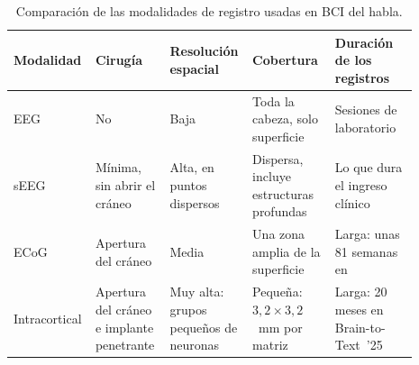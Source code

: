 \begin{table}[htbp]
  \centering
  \caption{Comparación de las modalidades de registro usadas en BCI del habla.}
  \label{tab:sota-modalidades}
  \footnotesize
  \setlength{\tabcolsep}{4pt}
  \renewcommand{\arraystretch}{1.2}
  \begin{tabular}{>{\raggedright\arraybackslash}p{0.14\linewidth}
                  >{\raggedright\arraybackslash}p{0.18\linewidth}
                  >{\raggedright\arraybackslash}p{0.17\linewidth}
                  >{\raggedright\arraybackslash}p{0.2\linewidth}
                  >{\raggedright\arraybackslash}p{0.2\linewidth}}
    \toprule
    \textbf{Modalidad} & \textbf{Cirugía} & \textbf{Resolución espacial} & \textbf{Cobertura} & \textbf{Duración de los registros} \\
    \midrule
    EEG           & No & Baja & Toda la cabeza, solo superficie & Sesiones de laboratorio \\
    sEEG          & Mínima, sin abrir el cráneo \cite{verwoert2022} & Alta, en puntos dispersos & Dispersa, incluye estructuras profundas & Lo que dura el ingreso clínico \\
    ECoG          & Apertura del cráneo \cite{kohler2022} & Media & Una zona amplia de la superficie & Larga: unas 81 semanas en \cite{moses2021} \\
    Intracortical & Apertura del cráneo e implante penetrante & Muy alta: grupos pequeños de neuronas & Pequeña: $3{,}2 \times 3{,}2$~mm por matriz \cite{card2024} & Larga: 20 meses en Brain-to-Text~'25 \cite{b2t25} \\
    \bottomrule
  \end{tabular}
\end{table}

